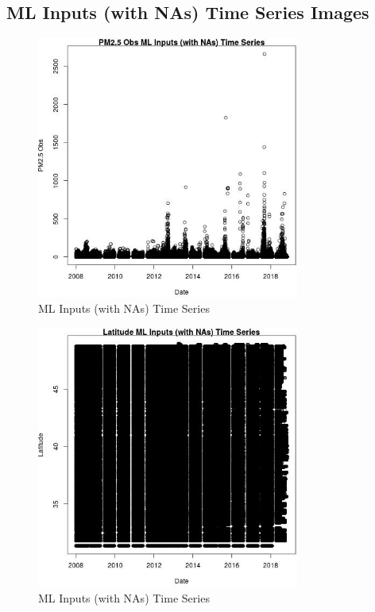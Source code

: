 
\subsection{ML Inputs (with NAs) Time Series Images} 
 

\begin{figure} 
\centering  
\includegraphics[width=0.77\textwidth]{Code_Outputs/Report_ML_input_PM25_Step4_part_e_de_duplicated_aves_compiled_2019-05-20wNAs_PM25_ObsvDate.jpg} 
\caption{\label{fig:Report_ML_input_PM25_Step4_part_e_de_duplicated_aves_compiled_2019-05-20wNAsPM25_ObsvDate}ML Inputs (with NAs) Time Series} 
\end{figure} 
 

\begin{figure} 
\centering  
\includegraphics[width=0.77\textwidth]{Code_Outputs/Report_ML_input_PM25_Step4_part_e_de_duplicated_aves_compiled_2019-05-20wNAs_LatitudevDate.jpg} 
\caption{\label{fig:Report_ML_input_PM25_Step4_part_e_de_duplicated_aves_compiled_2019-05-20wNAsLatitudevDate}ML Inputs (with NAs) Time Series} 
\end{figure} 
 

